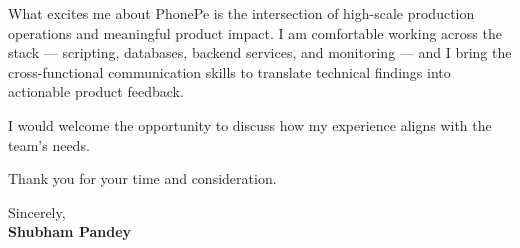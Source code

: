\documentclass[a4paper,11pt]{article}
\begin{document}
\vspace{8pt}

What excites me about PhonePe is the intersection of high-scale production operations and meaningful product impact. I am comfortable working across the stack --- scripting, databases, backend services, and monitoring --- and I bring the cross-functional communication skills to translate technical findings into actionable product feedback.

\vspace{8pt}

I would welcome the opportunity to discuss how my experience aligns with the team's needs.

\vspace{12pt}

Thank you for your time and consideration.

\vspace{12pt}

Sincerely, \\[6pt]
\textbf{Shubham Pandey}
\end{document}
